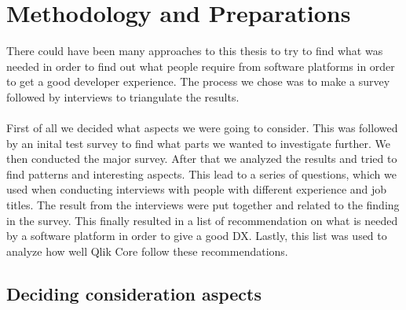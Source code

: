 \documentclass{article}
\begin{document}
\section{Methodology and Preparations}

There could have been many approaches to this thesis to try to find what was needed in order to find out
what people require from software platforms in order to get a good developer experience. The process we chose was to make
a survey followed by interviews to triangulate the results.
\\ \\
First of all we decided what aspects we were going to consider. This was followed by an inital test survey to find what
parts we wanted to investigate further. We then conducted the major survey. After that we analyzed the results and tried to find
patterns and interesting aspects. This lead to a series of questions, which we used when conducting interviews with people with
different experience and job titles. The result from the interviews were put together and related to the finding in the survey.
This finally resulted in a list of recommendation on what is needed by a software platform in order to give a good DX.
Lastly, this list was used to analyze how well Qlik Core follow these recommendations.

\subsection{Deciding consideration aspects}
\end{document}
